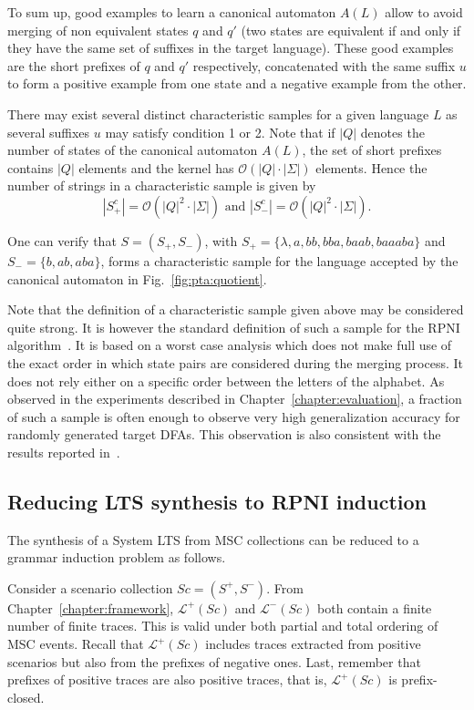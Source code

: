 To sum up, good examples to learn a canonical automaton $A(L)$ allow to avoid merging of non equivalent states $q$ and $q'$ (two states are equivalent if and only if they have the same set of suffixes in the target language). These good examples are the short prefixes of $q$ and $q'$ respectively, concatenated with the same suffix $u$ to form a positive example from one state and a negative example from the other. 

There may exist several distinct characteristic samples for a given language $L$ as several suffixes $u$ may satisfy condition 1 or 2. Note that if $|Q|$ denotes the number of states of the canonical automaton $A(L)$, the set of short prefixes contains $|Q|$ elements and the kernel has $\mathcal{O}(|Q|\cdot |\Sigma |)$ elements. Hence the number of strings in a characteristic sample is given by 
\[
|S_{+}^c|=\mathcal{O}(|Q|^2\cdot |\Sigma |)\mbox{ and }|S_{-}^c|=\mathcal{O}(|Q|^2\cdot |\Sigma |). 
\]

One can verify that $S = (S_+, S_-)$, with $S_+ = \{\lambda, a, bb, bba, baab, baaaba\}$ and $S_- = \{b, ab, aba\}$, forms a characteristic sample for the language accepted by the canonical automaton in Fig.~\ref{fig:pta:quotient}.

Note that the definition of a characteristic sample given above may be considered quite strong. It is however the standard definition of such a sample for the RPNI algorithm~\cite{Oncina:1992,Dupont:1996b}. It is based on a worst case analysis which does not make full use of the exact order in which state pairs are considered during the merging process. It does not rely either on a specific order between the letters of the alphabet. As observed in the experiments described in Chapter~\ref{chapter:evaluation}, a fraction of such a sample is often enough to observe very high generalization accuracy for randomly generated target DFAs. This observation is also consistent with the results reported in~\cite{Lang:1998}.

\subsection{Reducing LTS synthesis to RPNI induction}

The synthesis of a System LTS from MSC collections can be reduced to a grammar induction problem as follows. 

Consider a scenario collection $Sc = (S^+, S^-)$. From Chapter~\ref{chapter:framework}, $\mathcal{L}^+(Sc)$ and $\mathcal{L}^-(Sc)$ both contain a finite number of finite traces. This is valid under both partial and total ordering of MSC events. Recall that $\mathcal{L}^+(Sc)$ includes traces extracted from positive scenarios but also from the prefixes of negative ones. Last, remember that prefixes of positive traces are also positive traces, that is, $\mathcal{L}^+(Sc)$ is prefix-closed.

